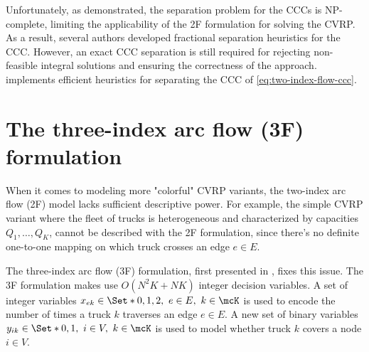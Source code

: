Unfortunately, as \textcite{augerat1995} demonstrated,
the separation problem for the CCCs is NP-complete,
limiting the applicability of the 2F formulation for solving the CVRP.
As a result, several authors \parencite{augerat1995, augerat1998, ralphs2003}
developed fractional separation heuristics for the CCC.
However,
an exact CCC separation is still required
for rejecting non-feasible integral solutions
and ensuring the correctness of the approach.
\textcite{lysgaard2003cvrpsep} implements efficient
heuristics for separating the CCC of \cref{eq:two-index-flow-ccc}.

\section{The three-index arc flow (3F) formulation}
\label{sec:cvrp-three-index-flow-formulation}

When it comes to modeling more "colorful" CVRP variants,
the two-index arc flow (2F) model lacks sufficient descriptive power.
For example,
the simple CVRP variant where the fleet of trucks is heterogeneous
and characterized by capacities $Q_1, \dots, Q_K$,
cannot be described with the 2F formulation,
since there's no definite one-to-one mapping on which truck crosses an edge $e \in E$.

The three-index arc flow (3F) formulation,
first presented in \textcite{golden1977},
fixes this issue.
The 3F formulation makes use $O(N^2 K + N K)$ integer decision variables.
A set of integer variables $x_{ek} \in \Set*{0, 1, 2},\ e \in E,\ k \in \mcK$
is used to encode the number of times a truck $k$ traverses an edge $e \in E$.
A new set of binary variables $y_{ik} \in \Set*{0, 1},\ i \in V,\ k \in \mcK$
is used to model whether truck $k$ covers a node $i \in V$.

